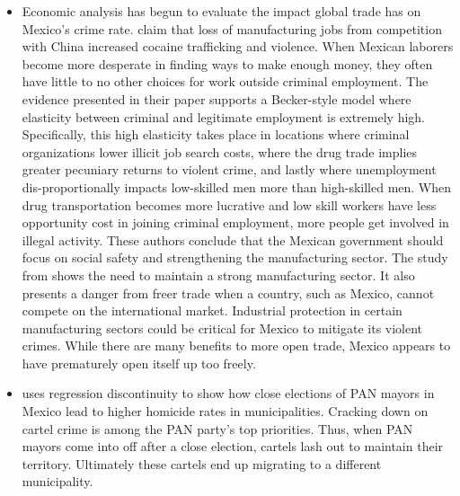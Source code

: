 \documentclass[12pt]{article}
\begin{document}
\begin{itemize}
    \item Economic analysis has begun to evaluate the impact global trade has on Mexico's crime rate. \cite{dell2019violent} claim that loss of manufacturing jobs from competition with China increased cocaine trafficking and violence. When Mexican laborers become more desperate in finding ways to make enough money, they often have little to no other choices for work outside criminal employment. The evidence presented in their paper supports a Becker-style model where elasticity between criminal and legitimate employment is extremely high. Specifically, this high elasticity takes place in locations where criminal organizations lower illicit job search costs, where the drug trade implies greater pecuniary returns to violent crime, and lastly where unemployment dis-proportionally impacts low-skilled men more than high-skilled men. When drug transportation becomes more lucrative and low skill workers have less opportunity cost in joining criminal employment, more people get involved in illegal activity. These authors conclude that the Mexican government should focus on social safety and strengthening the manufacturing sector. The study from \cite{dell2019violent} shows the need to maintain a strong manufacturing sector. It also presents a danger from freer trade when a country, such as Mexico, cannot compete on the international market. Industrial protection in certain manufacturing sectors could be critical for Mexico to mitigate its violent crimes. While there are many benefits to more open trade, Mexico appears to have  prematurely open itself up too freely.
    \item \cite{dell2015trafficking} uses regression discontinuity to show how close elections of PAN mayors in Mexico lead to higher homicide rates in municipalities. Cracking down on cartel crime is among the PAN party's top priorities. Thus, when PAN mayors come into off after a close election, cartels lash out to maintain their territory. Ultimately these cartels end up migrating to a different municipality. 
\end{itemize}

\newpage
\end{document}
